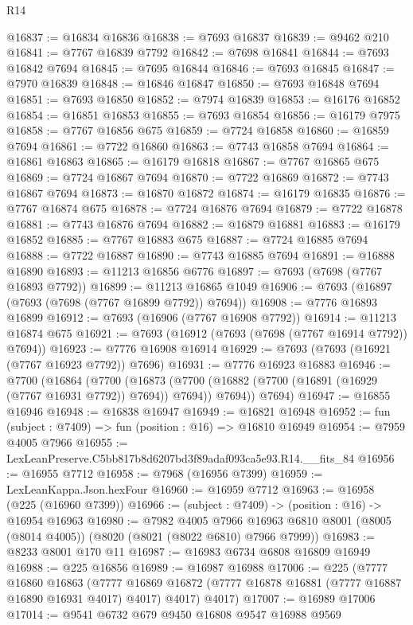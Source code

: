 \begin{lexlean}{R14}
\begin{coremodule}
@16837 := @16834 @16836
@16838 := @7693 @16837
@16839 := @9462 @210
@16841 := @7767 @16839 @7792
@16842 := @7698 @16841
@16844 := @7693 @16842 @7694
@16845 := @7695 @16844
@16846 := @7693 @16845
@16847 := @7970 @16839
@16848 := @16846 @16847
@16850 := @7693 @16848 @7694
@16851 := @7693 @16850
@16852 := @7974 @16839
@16853 := @16176 @16852
@16854 := @16851 @16853
@16855 := @7693 @16854
@16856 := @16179 @7975
@16858 := @7767 @16856 @675
@16859 := @7724 @16858
@16860 := @16859 @7694
@16861 := @7722 @16860
@16863 := @7743 @16858 @7694
@16864 := @16861 @16863
@16865 := @16179 @16818
@16867 := @7767 @16865 @675
@16869 := @7724 @16867 @7694
@16870 := @7722 @16869
@16872 := @7743 @16867 @7694
@16873 := @16870 @16872
@16874 := @16179 @16835
@16876 := @7767 @16874 @675
@16878 := @7724 @16876 @7694
@16879 := @7722 @16878
@16881 := @7743 @16876 @7694
@16882 := @16879 @16881
@16883 := @16179 @16852
@16885 := @7767 @16883 @675
@16887 := @7724 @16885 @7694
@16888 := @7722 @16887
@16890 := @7743 @16885 @7694
@16891 := @16888 @16890
@16893 := @11213 @16856 @6776
@16897 := @7693 (@7698 (@7767 @16893 @7792))
@16899 := @11213 @16865 @1049
@16906 := @7693 (@16897 (@7693 (@7698 (@7767 @16899 @7792)) @7694))
@16908 := @7776 @16893 @16899
@16912 := @7693 (@16906 (@7767 @16908 @7792))
@16914 := @11213 @16874 @675
@16921 := @7693 (@16912 (@7693 (@7698 (@7767 @16914 @7792)) @7694))
@16923 := @7776 @16908 @16914
@16929 := @7693 (@7693 (@16921 (@7767 @16923 @7792)) @7696)
@16931 := @7776 @16923 @16883
@16946 := @7700
    (@16864
      (@7700
        (@16873 (@7700 (@16882 (@7700 (@16891 (@16929 (@7767 @16931 @7792)) @7694)) @7694)) @7694))
      @7694)
@16947 := @16855 @16946
@16948 := @16838 @16947
@16949 := @16821 @16948
@16952 := fun (subject : @7409) => fun (position : @16) => @16810 @16949
@16954 := @7959 @4005 @7966
@16955 := LexLeanPreserve.C5bb817b8d6207bd3f89adaf093ca5e93.R14.__fits_84
@16956 := @16955 @7712
@16958 := @7968 (@16956 @7399)
@16959 := LexLeanKappa.Json.hexFour
@16960 := @16959 @7712
@16963 := @16958 (@225 (@16960 @7399))
@16966 := (subject : @7409) -> (position : @16) -> @16954 @16963
@16980 := @7982
    @4005
    @7966
    @16963
    @6810
    @8001
    (@8005 (@8014 @4005))
    (@8020 (@8021 (@8022 @6810) @7966 @7999))
@16983 := @8233 @8001 @170 @11
@16987 := @16983 @6734 @6808 @16809 @16949
@16988 := @225 @16856
@16989 := @16987 @16988
@17006 := @225
    (@7777
      @16860
      @16863
      (@7777 @16869 @16872 (@7777 @16878 @16881 (@7777 @16887 @16890 @16931 @4017) @4017) @4017)
      @4017)
@17007 := @16989 @17006
@17014 := @9541 @6732 @679 @9450 @16808 @9547 @16988 @9569

\end{coremodule}
\end{lexlean}

